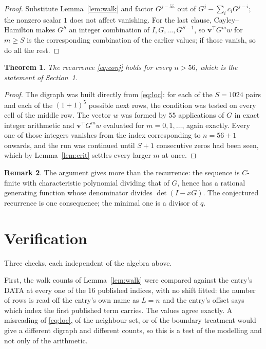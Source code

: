 \documentclass[11pt,a4paper]{article}
\theoremstyle{plain}
\newtheorem{theorem}{Theorem}
\theoremstyle{definition}
\newtheorem{remark}[theorem]{Remark}
\begin{document}
\begin{proof}
Substitute Lemma~\ref{lem:walk} and factor $G^{j-55}$ out of
$G^{j}-\sum_ic_iG^{j-i}$; the nonzero scalar $1$ does not affect
vanishing. For the last clause, Cayley--Hamilton makes $G^{S}$ an integer combination of
$I,G,\dots,G^{S-1}$, so $\mathbf{v}^{\!\top}G^{m}w$ for $m\ge S$ is the corresponding
combination of the earlier values; if those vanish, so do all the rest.
\end{proof}

\begin{theorem}
The recurrence \eqref{eq:conj} holds for every $n>56$, which is the statement of
Section~1.
\end{theorem}

\begin{proof}
The digraph was built directly from \eqref{eq:loc}: for each of the $S=1024$ pairs and each
of the $(1+1)^{5}$ possible next rows, the condition was tested on every cell of
the middle row. The vector $w$ was formed by $55$ applications of $G$ in exact integer
arithmetic and $\mathbf{v}^{\!\top}G^{m}w$ evaluated for $m=0,1,\dots$, again exactly.
Every one of those integers vanishes from the index corresponding to $n=56+1$ onwards,
and the run was continued until $S+1$ consecutive zeros had been seen, which by
Lemma~\ref{lem:crit} settles every larger $m$ at once.
\end{proof}

\begin{remark}
The argument gives more than the recurrence: the sequence is $C$-finite with characteristic
polynomial dividing that of $G$, hence has a rational generating function whose denominator
divides $\det(I-xG)$. The conjectured recurrence is one consequence; the minimal one is a
divisor of $q$.
\end{remark}

\section{Verification}

Three checks, each independent of the algebra above.

First, the walk counts of Lemma~\ref{lem:walk} were compared against the entry's DATA at
every one of the $16$ published indices, with no shift fitted: the number of rows is
read off the entry's own name as $L=n$ and the entry's offset says which index the first
published term carries. The values agree exactly. A misreading of \eqref{eq:loc}, of the
neighbour set, or of the boundary treatment would give a different digraph and different
counts, so this is a test of the modelling and not only of the arithmetic.
\end{document}
